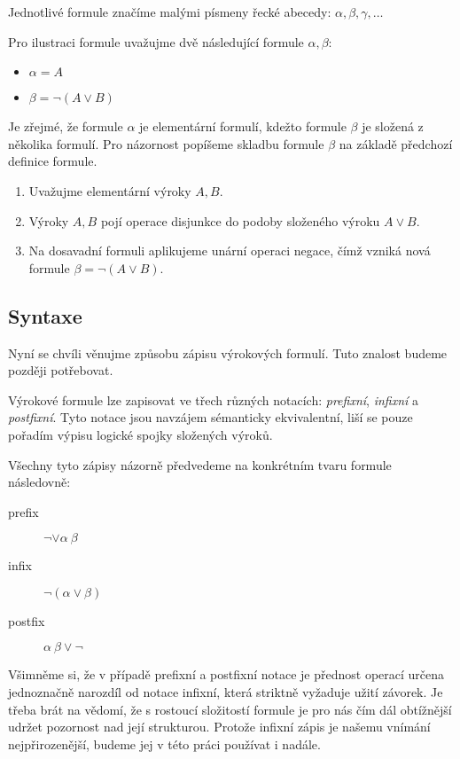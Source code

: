 \documentclass[thesis=B,czech,hidelinks]{FITthesis}[2012/06/26]
\begin{document}
Jednotlivé formule značíme malými písmeny řecké abecedy: $\alpha , \beta , \gamma , \ldots$

\begin{ex}
	Pro ilustraci formule uvažujme dvě následující formule $\alpha, \beta$:
	\begin{itemize}
		\item $\alpha = A$
		\item $\beta = \neg (A \vee B)$
	\end{itemize}
	Je zřejmé, že formule $\alpha$ je elementární formulí, kdežto formule $\beta$ je složená z několika formulí. Pro názornost popíšeme skladbu formule $\beta$ na základě předchozí definice formule.
	\begin{enumerate}
		\item Uvažujme elementární výroky $A, B$.
		\item Výroky $A, B$ pojí operace disjunkce do podoby složeného výroku $A \vee B$.
		\item Na dosavadní formuli aplikujeme unární operaci negace, čímž vzniká nová formule $\beta = \neg (A\vee B)$.
	\end{enumerate}
\end{ex}

\subsection{Syntaxe}

Nyní se chvíli věnujme způsobu zápisu výrokových formulí. Tuto znalost budeme později potřebovat.

Výrokové formule lze zapisovat ve třech různých notacích: \emph{prefixní}, \emph{infixní} a \emph{postfixní}. Tyto notace jsou navzájem sémanticky ekvivalentní, liší se pouze pořadím výpisu logické spojky složených výroků.

\begin{ex}
Všechny tyto zápisy názorně předvedeme na konkrétním tvaru formule následovně:
\begin{description}
	\item[prefix] $\neg \vee \alpha \: \beta$
	\item[infix] $\neg (\alpha \vee \beta)$
	\item[postfix] $\alpha \: \beta \vee \neg$
\end{description}
\end{ex}

Všimněme si, že v případě prefixní a postfixní notace je přednost operací určena jednoznačně narozdíl od notace infixní, která striktně vyžaduje užití závorek. Je třeba brát na vědomí, že s rostoucí složitostí formule je pro nás čím dál obtížnější udržet pozornost nad její strukturou. Protože infixní zápis je našemu vnímání nejpřirozenější, budeme jej v této práci používat i nadále.
\end{document}

